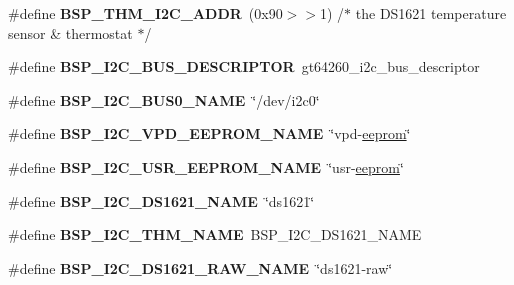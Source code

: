 \begin{DoxyCompactItemize}
\#define {\bfseries B\+S\+P\+\_\+\+T\+H\+M\+\_\+\+I2\+C\+\_\+\+A\+D\+DR}~(0x90$>$$>$1)    /$\ast$ the D\+S1621 temperature sensor \& thermostat $\ast$/
\item 
\mbox{\label{group__RTEMSBSPsPowerPCBeatnik_ga4348cd2d6609f1b1f0f9e8ce4a98c809}} 
\#define {\bfseries B\+S\+P\+\_\+\+I2\+C\+\_\+\+B\+U\+S\+\_\+\+D\+E\+S\+C\+R\+I\+P\+T\+OR}~gt64260\+\_\+i2c\+\_\+bus\+\_\+descriptor
\item 
\mbox{\label{group__RTEMSBSPsPowerPCBeatnik_ga3a433870b4d7d91081f72deb2ad9562e}} 
\#define {\bfseries B\+S\+P\+\_\+\+I2\+C\+\_\+\+B\+U\+S0\+\_\+\+N\+A\+ME}~\char`\"{}/dev/i2c0\char`\"{}
\item 
\mbox{\label{group__RTEMSBSPsPowerPCBeatnik_ga4e46e135be14c3c0f9957999beb4e680}} 
\#define {\bfseries B\+S\+P\+\_\+\+I2\+C\+\_\+\+V\+P\+D\+\_\+\+E\+E\+P\+R\+O\+M\+\_\+\+N\+A\+ME}~\char`\"{}vpd-\/\mbox{\hyperlink{structeeprom}{eeprom}}\char`\"{}
\item 
\mbox{\label{group__RTEMSBSPsPowerPCBeatnik_gae85811de59e3f6032d0a1b5f2fbbbd57}} 
\#define {\bfseries B\+S\+P\+\_\+\+I2\+C\+\_\+\+U\+S\+R\+\_\+\+E\+E\+P\+R\+O\+M\+\_\+\+N\+A\+ME}~\char`\"{}usr-\/\mbox{\hyperlink{structeeprom}{eeprom}}\char`\"{}
\item 
\mbox{\label{group__RTEMSBSPsPowerPCBeatnik_gabfd9ae31bf393d2d82f0ac6413d47712}} 
\#define {\bfseries B\+S\+P\+\_\+\+I2\+C\+\_\+\+D\+S1621\+\_\+\+N\+A\+ME}~\char`\"{}ds1621\char`\"{}
\item 
\mbox{\label{group__RTEMSBSPsPowerPCBeatnik_gaf379938407abe8d343d036b61fbb2b32}} 
\#define {\bfseries B\+S\+P\+\_\+\+I2\+C\+\_\+\+T\+H\+M\+\_\+\+N\+A\+ME}~B\+S\+P\+\_\+\+I2\+C\+\_\+\+D\+S1621\+\_\+\+N\+A\+ME
\item 
\mbox{\label{group__RTEMSBSPsPowerPCBeatnik_ga8a763e4549aea4df41baca4a7d5b7eb8}} 
\#define {\bfseries B\+S\+P\+\_\+\+I2\+C\+\_\+\+D\+S1621\+\_\+\+R\+A\+W\+\_\+\+N\+A\+ME}~\char`\"{}ds1621-\/raw\char`\"{}
\item 
\mbox{\label{group__RTEMSBSPsPowerPCBeatnik_ga6706e5f374969099b9406839f78020ae}} 
$$
\end{DoxyCompactItemize}
